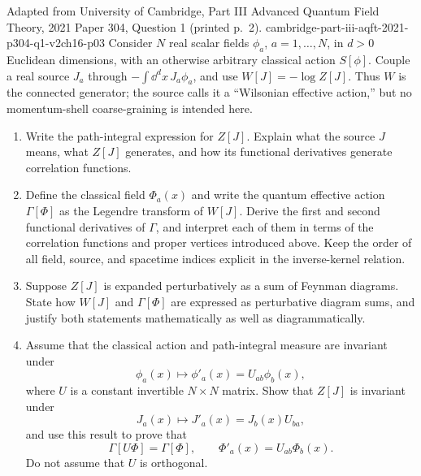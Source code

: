 \begin{enumerate}
  {Adapted from University of Cambridge, Part III Advanced Quantum Field
  Theory, 2021 Paper 304, Question 1 (printed p.~2).}
  {cambridge-part-iii-aqft-2021-p304-q1-v2ch16-p03}
  Consider \(N\) real scalar fields
  \(\phi_a\), \(a=1,\ldots,N\), in \(d>0\) Euclidean dimensions, with an
  otherwise arbitrary classical action \(S[\phi]\).  Couple a real source
  \(J_a\) through \(-\int \dd^dx\,J_a\phi_a\), and use
  \(W[J]=-\log Z[J]\).  Thus \(W\) is the connected generator; the source
  calls it a ``Wilsonian effective action,'' but no momentum-shell
  coarse-graining is intended here.
  \begin{enumerate}
    \item[(a)]
    Write the path-integral expression for \(Z[J]\).  Explain what the source
    \(J\) means, what \(Z[J]\) generates, and how its functional derivatives
    generate correlation functions.
    \item[(b)]
    Define the classical field \(\Phi_a(x)\) and write the quantum effective
    action \(\Gamma[\Phi]\) as the Legendre transform of \(W[J]\).  Derive
    the first and second functional derivatives of \(\Gamma\), and interpret
    each of them in terms of the correlation functions and proper vertices
    introduced above.  Keep the order of all field, source, and spacetime
    indices explicit in the inverse-kernel relation.
    \item[(c)]
    Suppose \(Z[J]\) is expanded perturbatively as a sum of Feynman diagrams.
    State how \(W[J]\) and \(\Gamma[\Phi]\) are expressed as perturbative
    diagram sums, and justify both statements mathematically as well as
    diagrammatically.
    \item[(d)]
    Assume that the classical action and path-integral measure are invariant
    under
    \[
      \phi_a(x)\longmapsto\phi'_a(x)=U_{ab}\phi_b(x),
    \]
    where \(U\) is a constant invertible \(N\times N\) matrix.  Show that
    \(Z[J]\) is invariant under
    \[
      J_a(x)\longmapsto J'_a(x)=J_b(x)U_{ba},
    \]
    and use this result to prove that
    \[
      \Gamma[U\Phi]=\Gamma[\Phi],\qquad
      \Phi'_a(x)=U_{ab}\Phi_b(x).
    \]
    Do not assume that \(U\) is orthogonal.
  \end{enumerate}


\end{enumerate}
